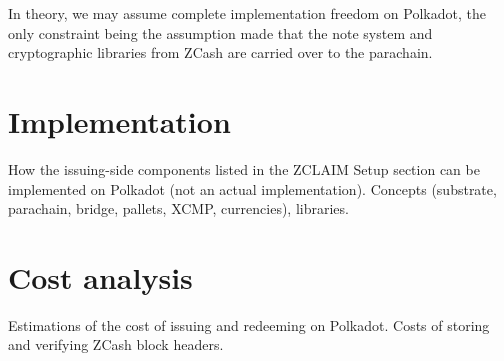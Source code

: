 In theory, we may assume complete implementation freedom on Polkadot, the only constraint being the assumption made that the note system and cryptographic libraries from ZCash are carried over to the parachain.

\section{Implementation}
How the issuing-side components listed in the ZCLAIM Setup section can be implemented on Polkadot (not an actual implementation). Concepts (substrate, parachain, bridge, pallets, XCMP, currencies), libraries.

\section{Cost analysis}
Estimations of the cost of issuing and redeeming on Polkadot. Costs of storing and verifying ZCash block headers.


